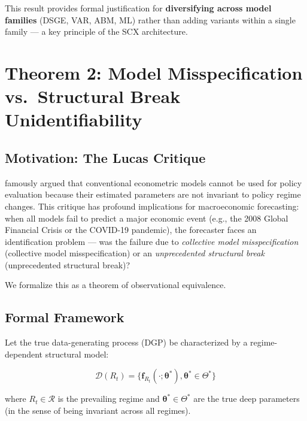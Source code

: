 \documentclass[12pt,a4paper]{article}
\begin{document}
This result provides formal justification for \textbf{diversifying across
model families} (DSGE, VAR, ABM, ML) rather than adding variants within
a single family --- a key principle of the SCX architecture.

\section{Theorem 2: Model Misspecification vs.\ Structural Break
Unidentifiability}
\label{sec:theorem2}

\subsection{Motivation: The Lucas Critique}

\citet{lucas1976econometric} famously argued that conventional econometric
models cannot be used for policy evaluation because their estimated
parameters are not invariant to policy regime changes.  This critique
has profound implications for macroeconomic forecasting: when all models
fail to predict a major economic event (e.g., the 2008 Global Financial
Crisis or the COVID-19 pandemic), the forecaster faces an identification
problem --- was the failure due to \emph{collective model misspecification}
(collective model misspecification) or an \emph{unprecedented structural break}
(unprecedented structural break)?

We formalize this as a theorem of observational equivalence.

\subsection{Formal Framework}

Let the true data-generating process (DGP) be characterized by a
regime-dependent structural model:

\begin{equation}
    \mathcal{D}(R_t) = \{\mathbf{f}_{R_t}(\cdot; \boldsymbol{\theta}^*),
    \boldsymbol{\theta}^* \in \Theta^*\} \label{eq:true_dgp}
\end{equation}

where $R_t \in \mathcal{R}$ is the prevailing regime and
$\boldsymbol{\theta}^* \in \Theta^*$ are the true deep parameters
(in the sense of being invariant across all regimes).
\end{document}
